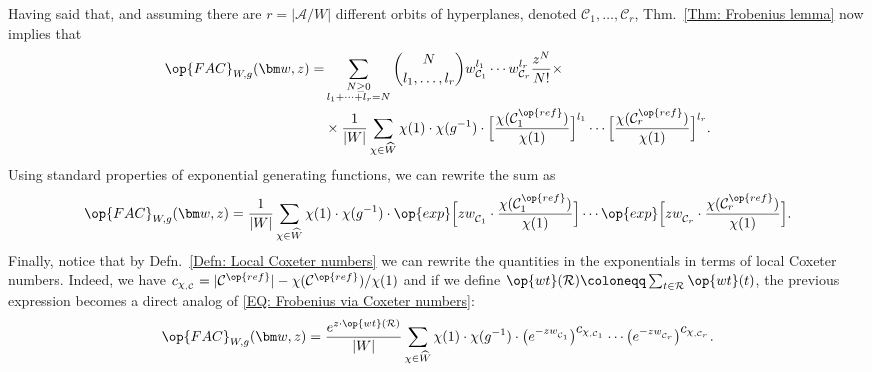 Having said that, and assuming there are $r=|\mathcal{A}/W|$ different orbits of hyperplanes, denoted $\mathcal{C}_1,\ldots, \mathcal{C}_r$, Thm.~\ref{Thm: Frobenius lemma} now implies that \begin{align*}
\op{FAC}_{W,g}(\bm w,z)=&\sum_{\substack{ N\geq 0\\l_1+\cdots +l_r=N}}\binom{N}{l_1,\ldots,l_r}w_{\mathcal{C}_1}^{l_1}\cdots w_{\mathcal{C}_r}^{l_r} \dfrac{z^N}{N!}\times\\
&\times\dfrac{1}{|W|}\sum_{\chi\in\widehat{W}}\chi(1)\cdot \chi(g^{-1})\cdot \Big[ \dfrac{\chi(\mathcal{C}^{\op{ref}}_1)}{\chi(1)}\Big]^{l_1}\cdots \Big[ \dfrac{\chi(\mathcal{C}^{\op{ref}}_r)}{\chi(1)}\Big]^{l_r}.\end{align*}Using standard properties of exponential generating functions, we can rewrite the sum as$$ 
\op{FAC}_{W,g}(\bm w,z)=\dfrac{1}{|W|}\sum_{\chi\in\widehat{W}}\chi(1)\cdot\chi(g^{-1})\cdot\op{exp}\Big[ zw_{\mathcal{C}_1}^{\phantom{l_1}}\cdot \dfrac{\chi(\mathcal{C}_1^{\op{ref}})}{\chi(1)}\Big]\cdots \op{exp}\Big[ zw_{\mathcal{C}_r}^{\phantom{l_r}}\cdot \dfrac{\chi(\mathcal{C}_r^{\op{ref}})}{\chi(1)}\Big].$$
Finally, notice that by Defn.~\ref{Defn: Local Coxeter numbers} we can rewrite the quantities in the exponentials in terms of local Coxeter numbers. Indeed, we have $c_{\chi_{,\mathcal{C}}}=|\mathcal{C}^{\op{ref}}|-\chi(\mathcal{C}^{\op{ref}})/\chi(1)$ and if we define $\op{wt}(\mathcal{R})\coloneqq \sum_{t\in\mathcal{R}}\op{wt}(t)$, the previous expression becomes a direct analog of \eqref{EQ: Frobenius via Coxeter numbers}: 
\begin{equation}
\op{FAC}_{W,g}(\bm w,z)=\dfrac{e^{z\cdot\op{wt}(\mathcal{R})}}{|W|}\sum_{\chi\in\widehat{W}}\chi(1)\cdot\chi(g^{-1})\cdot \big(e^{-zw_{\mathcal{C}_1}^{\phantom{l_1}}}\big)^{\displaystyle c_{\chi_{,\mathcal{C}_1}}}\cdots \big( e^{-zw_{\mathcal{C}_r}^{\phantom{l_r}}}\big)^{\displaystyle c_{\chi_{,\mathcal{C}_r}}}.\label{EQ: weighted enum via local Coxeter numbers}
\end{equation}




